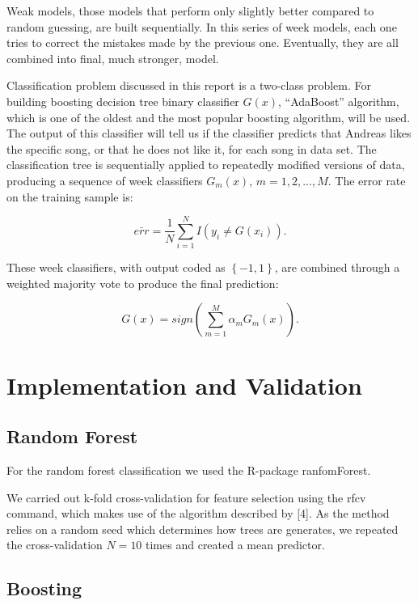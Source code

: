 \documentclass{article}
\begin{document}
Weak models, those models that perform only slightly better compared to random guessing, are built sequentially. In this series of week models, each one tries to correct the mistakes made by the previous one. Eventually, they are all combined into final, much stronger, model. 

Classification problem discussed in this report is a two-class problem. For building boosting decision tree binary classifier $G(x)$, ``AdaBoost'' algorithm, which is one of the oldest and the most popular boosting algorithm, will be used. The output of this classifier will tell us if the classifier predicts that Andreas likes the specific song, or that he does not like it, for each song in data set. The classification tree is sequentially applied to repeatedly modified versions of data, producing a sequence of week classifiers $G_m(x)$, $m=1,2,...,M$. The error rate on the training sample is:

\begin{equation} \label{boost_error_rate}
\bar{err}=\frac{1}{N}\sum_{i=1}^{N}I(y_i\neq G(x_i)).
\end{equation}

These week classifiers, with output coded as $\left\{-1,1\right\}$, are combined through a weighted
majority vote to produce the final prediction:

\begin{equation} \label{boost_final_pred}
G(x)=sign(\sum_{m=1}^{M}\alpha_m G_m(x)).
\end{equation}

\section{Implementation and Validation}

\subsection{Random Forest}

For the random forest classification we used the R-package {\selectfont ranfomForest}.

We carried out k-fold cross-validation for feature selection using the {\selectfont rfcv} command, which makes use of the algorithm described by [4]. As the method relies on a random seed which determines how trees are generates, we repeated the cross-validation $N=10$ times and created a mean predictor.

\subsection{Boosting}
\end{document}
